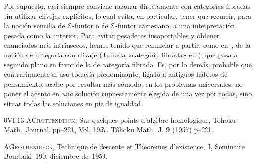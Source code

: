 \begin{remarquestar}
Por supuesto, casi siempre conviene razonar directamente con categorías
fibradas sin utilizar clivajes explícitos, lo cual evita, en particular,
tener que recurrir, para la noción sencilla de $\cal{E}$-funtor o de
$\cal{E}$-funtor cartesiano, a una interpretación pesada como la anterior.
Para evitar pesadeces insoportables y obtener enunciados más intrínsecos,
hemos tenido que renunciar a partir, como en~\cite{VI.2}, de la noción de
categoría con clivaje (llamada «categoría fibrada» en \loccit), que pasa a
segundo plano en favor de la de categoría fibrada. Es, por lo demás,
probable que, contrariamente al uso todavía predominante, ligado a antiguos
hábitos de pensamiento, acabe por resultar más cómodo, en los problemas
universales, no poner el acento en \emph{una} solución supuestamente elegida
de una vez por todas, sino situar todas las soluciones en pie de igualdad.
\end{remarquestar}

\begin{sgabibliography}{0}{VI.13}
 A\ptbl \textsc{Grothendieck}, Sur quelques points d'algèbre
homologique,
{Tohoku Math.\ Journal, pp--221, Vol, 1957.}
{T\^ohoku Math.\ J. \textbf{9} (1957) p--221.}

 A\ptbl \textsc{Grothendieck}, Technique de descente et
Théorèmes d'existence,~I, Séminaire Bourbaki~190, diciembre de~1959.
\end{sgabibliography}


